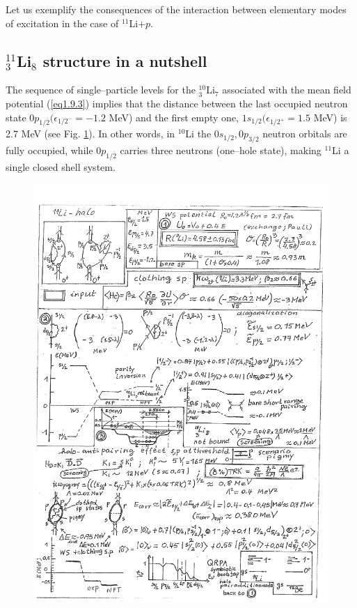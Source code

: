 Let us exemplify the consequences of the interaction between  elementary modes of excitation in the case of $^{11}$Li$+p$.
\subsection{$^{11}_3$Li$_8$ structure in a nutshell}
The sequence of single--particle levels for the $^{10}_3$Li$_7$ associated with the mean field potential (\ref{eq1.9.3}) implies that the distance between the last occupied neutron state $0p_{1/2}(\epsilon_{1/2^-}=-1.2$ MeV) and  the first empty one, $1s_{1/2}(\epsilon_{1/2^+}=1.5$ MeV) is 2.7 MeV (see Fig. \ref{fig1.9.1}). In other words, in $^{10}$Li the $0s_{1/2},0p_{3/2}$ neutron orbitals are fully occupied, while $0p_{1/2}$ carries three neutrons (one--hole state), making $^{11}$Li a single closed shell system.
     \begin{figure}
     \centerline {
     \includegraphics*[width=17cm]{introduccion/figs/figLi11}
     }
     \caption{}
     \label{fig1.9.1}
     \end{figure}

